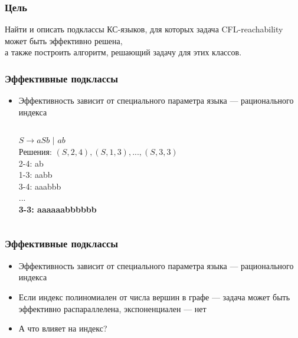 \documentclass{beamer}
\begin{document}
\begin{frame}
\frametitle{Цель}
Найти и описать подклассы КС-языков, для которых задача CFL-reachability может быть эффективно решена, \\ а также построить алгоритм, решающий задачу для этих классов.
\end{frame}


\begin{frame}
\frametitle{Эффективные подклассы}
\begin{itemize}
\item Эффективность зависит от специального параметра языка --- рационального индекса
\begin{columns}[c] %


$S \rightarrow aSb$ $|$ $ab$
\\
Решения: $(S, 2, 4), (S, 1, 3), ..., (S, 3, 3)$
\\2-4: ab
\\1-3: aabb
\\3-4: aaabbb
\\ ...
\\\textbf{3-3: aaaaaabbbbbb}


\end{columns}
\end{itemize}
\end{frame}

\begin{frame}
\frametitle{Эффективные подклассы}
\begin{itemize}
\item Эффективность зависит от специального параметра языка --- рационального индекса
\item Если индекс полиномиален от числа вершин в графе --- задача может быть эффективно распараллелена, экспоненциален --- нет
\item А что влияет на индекс?
\end{itemize}
\end{frame}
\end{document}

